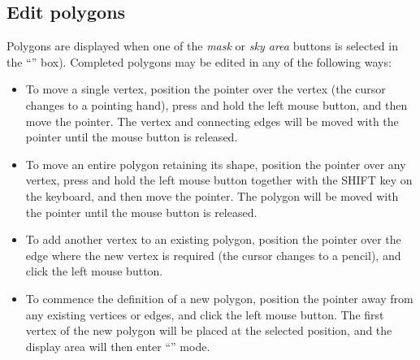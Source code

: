 \subsection {Edit polygons}
Polygons are displayed when one of the {\em mask} or {\em sky
area} buttons is selected in the ``'' 
box). Completed polygons may be edited in any of the following ways:

\begin{itemize}

\item To move a single vertex, position the pointer over the vertex (the
cursor changes to a pointing hand), press and hold the left mouse button,
and then move the pointer. The vertex and connecting edges will be moved
with the pointer until the mouse button is released.

\item To move an entire polygon retaining its shape, position the pointer
over any vertex, press and hold the left mouse button together with the
SHIFT key on the keyboard, and then move the pointer. The polygon will be
moved with the pointer until the mouse button is released.

\item To add another vertex to an existing polygon, position the pointer
over the edge where the new vertex is required (the cursor changes to a
pencil), and click the left mouse button.

\item To commence the definition of a new polygon, position the pointer
away from any existing vertices or edges, and click the left mouse button.
The first vertex of the new polygon will be placed at the selected
position, and the display area will then enter ``'' mode.

\end{itemize}


